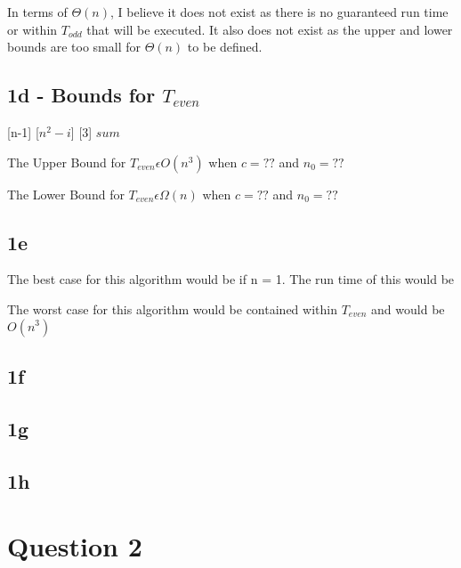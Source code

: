 \documentclass[oneside, a4paper]{article}
\begin{document}
In terms of $\Theta(n)$, I believe it does not exist as there is no guaranteed run time or within $T_{odd}$ that will be executed. It also does not exist as the upper and lower bounds are too small for $\Theta(n)$ to be defined.

\subsection*{1d - Bounds for $T_{even}$}

\begin{algorithmic}
     [n-1]
         [$n^2 - i$]
             [3]
        \EndFor
    \EndFor
    \State \Return $sum$
    \EndFunction
\end{algorithmic}

The Upper Bound for $T_{even} \epsilon O(n^3)$ when $c = ??$ and $n_0 = ??$ 

The Lower Bound for $T_{even} \epsilon \Omega(n)$ when $c = ??$ and $n_0 = ??$ 

\subsection*{1e}
The best case for this algorithm would be if n = 1. The run time of this would be 

The worst case for this algorithm would be contained within $T_{even}$ and would be $O(n^3)$

\subsection*{1f}
\subsection*{1g}
\subsection*{1h}

\newpage
\section*{Question 2}
\end{document}
